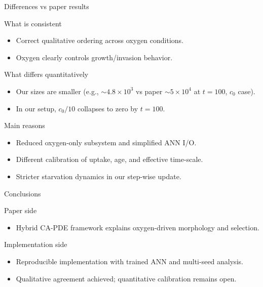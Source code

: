 \documentclass[10pt,aspectratio=169]{beamer}
\begin{document}
\begin{frame}[c]{Differences vs paper results}
\small
\begin{block}{What is consistent}
\begin{itemize}
  \item Correct qualitative ordering across oxygen conditions.
  \item Oxygen clearly controls growth/invasion behavior.
\end{itemize}
\end{block}

\begin{alertblock}{What differs quantitatively}
\begin{itemize}
  \item Our sizes are smaller (e.g., $\sim 4.8\times10^3$ vs paper $\sim 5\times10^4$ at $t=100$, $c_0$ case).
  \item In our setup, $c_0/10$ collapses to zero by $t=100$.
\end{itemize}
\end{alertblock}

\begin{block}{Main reasons}
\begin{itemize}
  \item Reduced oxygen-only subsystem and simplified ANN I/O.
  \item Different calibration of uptake, age, and effective time-scale.
  \item Stricter starvation dynamics in our step-wise update.
\end{itemize}
\end{block}
\end{frame}

\begin{frame}[c]{Conclusions}
\begin{block}{Paper side}
\begin{itemize}
  \item Hybrid CA-PDE framework explains oxygen-driven morphology and selection.
\end{itemize}
\end{block}

\begin{block}{Implementation side}
\begin{itemize}
  \item Reproducible implementation with trained ANN and multi-seed analysis.
  \item Qualitative agreement achieved; quantitative calibration remains open.
\end{itemize}
\end{block}
\end{frame}
\end{document}
